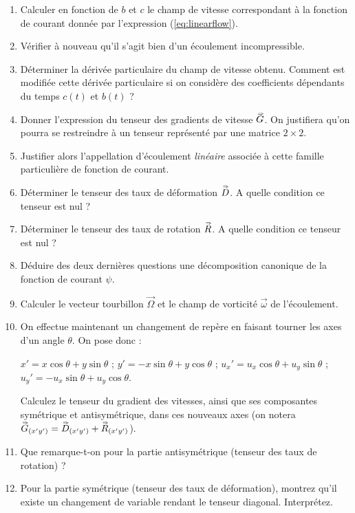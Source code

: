 \documentclass[10pt, a4paper]{article}
\renewcommand{\myvec}[1]{\vec{#1}}
\begin{document}
\begin{enumerate}
\item
	Calculer en fonction de $b$ et $c$ le champ de vitesse correspondant à la fonction de courant donnée par l'expression (\ref{eq:linearflow}).
\item
	Vérifier à nouveau qu'il s'agit bien d'un écoulement incompressible.
\item
	Déterminer la dérivée particulaire du champ de vitesse obtenu.
	Comment est modifiée cette dérivée particulaire si on considère des coefficients dépendants
	du temps $c(t)$ et $b(t)$ ?
\item
	Donner l'expression du tenseur des gradients de vitesse $\accentset{\Rightarrow}{G}$. 
	On justifiera qu'on pourra se restreindre à un tenseur représenté par une matrice $2\times2$.
\item
	Justifier alors l'appellation d'écoulement \textsl{linéaire} associée à cette famille 
	particulière de fonction de courant.
\item
	Déterminer le tenseur des taux de déformation $\accentset{\Rightarrow}{D}$. A quelle condition ce tenseur est nul ?
\item
	Déterminer le tenseur des taux de rotation $\accentset{\Rightarrow}{R}$. A quelle condition ce tenseur est nul ?
\item
	Déduire des deux dernières questions une décomposition canonique de la fonction de courant $\psi$.
\item
	Calculer le vecteur tourbillon $\myvec{\varOmega}$
	et le champ de vorticité $\myvec{\omega}$ de l'écoulement.

\item On effectue maintenant un changement de repère en faisant tourner les axes d'un angle $\theta$. On pose donc  : 

$x' = x \cos \theta + y \sin \theta$ ;  $y' = -x \sin \theta + y \cos \theta$ ;
$u_x' = u_x \cos \theta + u_y \sin \theta$ ;  $u_y' = -u_x \sin \theta + u_y \cos \theta$.

Calculez le tenseur du gradient des vitesses, ainsi que ses composantes symétrique et antisymétrique, dans ces nouveaux axes  
(on notera $\accentset{\Rightarrow}{G}_{(x'y')} =\accentset{\Rightarrow}{D}_{(x'y')} + \accentset{\Rightarrow}{R}_{(x'y')}$).

\item Que remarque-t-on pour la partie antisymétrique (tenseur des taux de rotation) ?

\item Pour la partie symétrique (tenseur des taux de déformation), montrez qu'il existe un changement de variable rendant le tenseur diagonal. Interprétez.


\end{enumerate}
\end{document}
